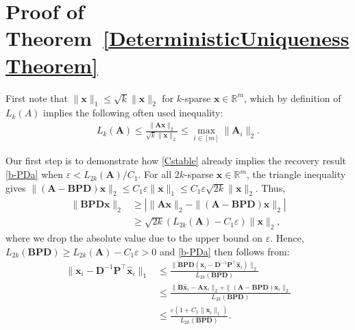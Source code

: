 \documentclass[9pt,twocolumn]{pnas-new}
\begin{document}
\section{Proof of Theorem~\ref{DeterministicUniquenessTheorem}}\label{DUT}

First note that $\|\mathbf{x}\|_1 \leq \sqrt{k} \|\mathbf{x}\|_2$ for $k$-sparse $\mathbf{x} \in \mathbb{R}^m$, which by definition of $L_k(A)$ implies the following often used inequality:
\begin{align}\label{delrho}
L_k(\mathbf{A}) \leq \frac{\|\mathbf{A}\mathbf{x}\|_2}{\sqrt{k} \|\mathbf{x}\|_2} %
\leq  \max_{i \in [m]}\|\mathbf{A}_i\|_2.
\end{align}

Our first step is to demonstrate how \eqref{Cstable} already implies the recovery result \eqref{b-PDa} when $\varepsilon < L_{2k}(\mathbf{A}) / C_1$. For all $2k$-sparse $\mathbf{x} \in \mathbb{R}^m$, the triangle inequality gives \mbox{$\|(\mathbf{A}-\mathbf{BPD})\mathbf{x}\|_2  \leq C_1\varepsilon \|\mathbf{x}\|_1 \leq C_1 \varepsilon \sqrt{2k}  \|\mathbf{x}\|_2$}. Thus, 
\begin{align*}
\|\mathbf{BPD}\mathbf{x}\|_2 
&\geq | \|\mathbf{A}\mathbf{x}\|_2 - \|(\mathbf{A}-\mathbf{BPD})\mathbf{x}\|_2 | \\
&\geq \sqrt{2k} (L_{2k}(\mathbf{A}) -  C_1\varepsilon) \|\mathbf{x}\|_2,
\end{align*}
%
where we drop the absolute value due to the upper bound on $\varepsilon$. Hence, $L_{2k}(\mathbf{BPD}) \geq L_{2k}(\mathbf{A}) - C_1\varepsilon  > 0$ and \eqref{b-PDa} then follows from:
\begin{align*}
\|\mathbf{x}_i - \mathbf{D}^{-1}\mathbf{P}^{\top}\mathbf{\hat x}_i \|_1
&\leq \frac{\|\mathbf{BPD}(\mathbf{x}_i - \mathbf{D}^{-1}\mathbf{P}^{\top}\mathbf{\hat x}_i)\|_2}{L_{2k}(\mathbf{BPD})} \\
&\leq \frac{\|\mathbf{B}\mathbf{\hat x}_i - \mathbf{A}\mathbf{x}_i\|_2 + \|(\mathbf{A} - \mathbf{BPD})\mathbf{x}_i\|_2}{L_{2k}(\mathbf{BPD})} \\
&\leq \frac{\varepsilon (1+C_1 \|\mathbf{x}_i\|_1)}{L_{2k}(\mathbf{BPD})}.
\end{align*}
\end{document}
